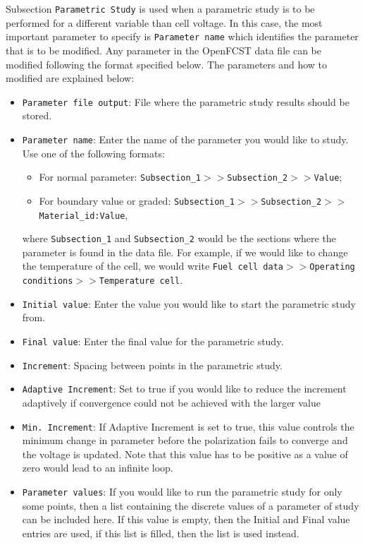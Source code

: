 Subsection \texttt{Parametric Study} is used when a parametric study is to be performed for a different variable than cell voltage. In this case, the most important parameter to specify is \texttt{Parameter name} which identifies the parameter that is to be modified. Any parameter in the OpenFCST data file can be modified following the format specified below. The parameters and how to modified are explained below:
\begin{itemize}
 \item \texttt{Parameter file output}: File where the parametric study results should be stored.
 \item \texttt{Parameter name}: Enter the name of the parameter you would like to study. Use one of the following formats:
 \begin{itemize}
   \item For normal parameter: \texttt{Subsection\_1$>>$Subsection\_2$>>$Value};
   \item For boundary value or graded: \texttt{Subsection\_1$>>$Subsection\_2$>>$Material\_id:Value},
 \end{itemize}
   where \texttt{Subsection\_1} and \texttt{Subsection\_2} would be the sections where the parameter is found in the data file. For example, if we would like to change the temperature of the cell, we would write \texttt{Fuel cell data$>>$Operating conditions$>>$Temperature cell}.
   \item \texttt{Initial value}: Enter the value you would like to start the parametric study from.
   \item \texttt{Final value}: Enter the final value for the parametric study.
   \item \texttt{Increment}: Spacing between points in the parametric study.
   \item \texttt{Adaptive Increment}: Set to true if you would like to reduce the increment adaptively if convergence could not be achieved with the larger value
   \item \texttt{Min. Increment}: If Adaptive Increment is set to true, this value controls the minimum change in parameter before the polarization fails to converge and the voltage is updated. Note that this value has to be positive as a value of zero would lead to an infinite loop.
   \item \texttt{Parameter values}: If you would like to run the parametric study for only some points, then a list containing the discrete values of a parameter of study can be included here. If this value is empty, then the Initial and Final value entries are used, if this list is filled, then the list is used instead.
\end{itemize}

